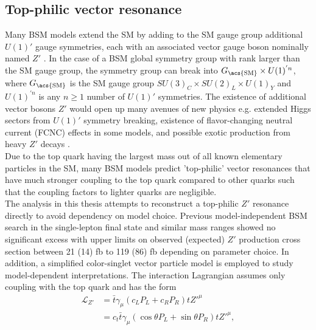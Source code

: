 \documentclass[../thesis.tex]{subfiles}
\begin{document}
\subsection{Top-philic vector resonance}
\label{sec:ttZp}
Many BSM models extend the \acs{SM} by adding to the \acs{SM} gauge group additional $U(1)'$ gauge symmetries, each with an associated vector gauge boson nominally named $Z'$ \citep{theory:Zp}. In the case of a \acs{BSM} global symmetry group with rank larger than the \acs{SM} gauge group, the symmetry group can break into $G_\text{\acs{SM}}\times U(1)^{'n}$, where $G_\text{\acs{SM}}$ is the \acs{SM} gauge group $SU(3)_C \times SU(2)_L \times U(1)_Y$ and $U(1)^{'n}$ is any $n\geq 1$ number of $U(1)'$ symmetries. The existence of additional vector bosons $Z'$ would open up many avenues of new physics e.g. extended Higgs sectors from $U(1)'$ symmetry breaking, existence of flavor-changing neutral current (FCNC) effects in some models, and possible exotic production from heavy $Z'$ decays \citep{theory:Zp}.\\
Due to the top quark having the largest mass out of all known elementary particles in the \acs{SM}, many \acs{BSM} models \citep{Ferretti:2013kya,Vecchi:2015fma,Agashe:2003zs,Agashe:2004rs} predict 'top-philic' vector resonances that have much stronger coupling to the top quark compared to other quarks such that the coupling factors to lighter quarks are negligible.\\
The analysis in this thesis attempts to reconstruct a top-philic $Z'$ resonance directly to avoid dependency on model choice. Previous model-independent \acs{BSM} \tttt search \citep{theory:ttZp} in the single-lepton final state and similar mass ranges showed no significant excess with upper limits on observed (expected) $Z'$ production cross section between 21 (14) fb to 119 (86) fb depending on parameter choice.
In addition, a simplified color-singlet vector particle model \citep{theory:ttZp,theory:ttZp_LHC} is employed to study model-dependent interpretations. The interaction Lagrangian assumes only coupling with the top quark and has the form
\begin{equation}
\begin{aligned}
\mathcal{L}_{Z'} &= \bar{t}\gamma_\mu\left(c_L P_L + c_R P_R\right) tZ'^{\mu}\\
&= c_t \bar{t}\gamma_\mu\left(\cos\theta P_L + \sin\theta P_R\right) tZ'^{\mu},
\end{aligned}
\end{equation}
\end{document}
